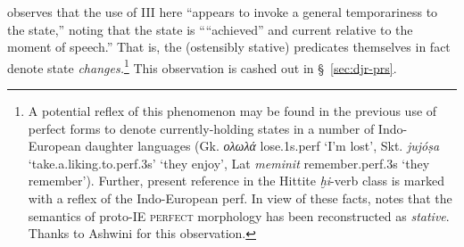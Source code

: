 \noindent \citet[365--6]{Wilkinson1991} observes that the use of \gls{III} here ``appears to invoke a general temporariness to the state,'' noting that the state is ````achieved'' and current relative to the moment of speech.'' That is, the (ostensibly stative) predicates themselves in fact denote state \textit{changes.}\footnote{A potential reflex of this phenomenon may be found in the previous use of perfect forms to denote currently-holding states in a number of Indo-European daughter languages (Gk. \textit{ολωλά} lose.1s.\gls{perf} `I'm lost', Skt. \textit{jujóṣa} `take.a.liking.to.\gls{perf}.3s' `they enjoy', Lat \textit{meminit} remember.\gls{perf}.3s `they remember'). Further, present reference in the Hittite \textit{ḫi}-verb class is marked with a reflex of the Indo-European \gls{perf}. In view of these facts, \citet[103--5]{Fortson2010} notes that the semantics of proto-IE \textsc{perfect} morphology has been reconstructed as \textit{stative}. Thanks to Ashwini for this observation.} This observation is cashed out in \S~\ref{sec:djr-prs}.



